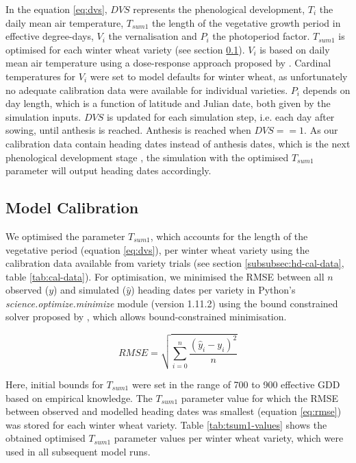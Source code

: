 In the equation \ref{eq:dvs}, $DVS$ represents the phenological development, $T_i$ the daily mean air temperature, $T_{sum1}$ the length of the vegetative growth period in effective degree-days, $V_i$ the vernalisation and $P_i$ the photoperiod factor. $T_{sum1}$ is optimised for each winter wheat variety (see section \ref{subsec:hd-model-cal}). $V_i$ is based on daily mean air temperature using a dose-response approach proposed by \cite{wang_simulation_1998}. Cardinal temperatures for $V_i$ were set to model defaults for winter wheat, as unfortunately no adequate calibration data were available for individual varieties. $P_i$ depends on day length, which is a function of latitude and Julian date, both given by the simulation inputs. $DVS$ is updated for each simulation step, i.e. each day after sowing, until anthesis is reached. Anthesis is reached when $DVS == 1$. As our calibration data contain heading dates instead of anthesis dates, which is the next phenological development stage \citep{meier_growth_2018}, the simulation with the optimised $T_{sum1}$ parameter will output heading dates accordingly.

\subsection{Model Calibration}
\label{subsec:hd-model-cal}
We optimised the parameter $T_{sum1}$, which accounts for the length of the vegetative period (equation \ref{eq:dvs}), per winter wheat variety using the calibration data available from variety trials (see section \ref{subsubsec:hd-cal-data}, table \ref{tab:cal-data}). For optimisation, we minimised the \gls{RMSE} between all $n$ observed ($y$) and simulated ($\hat{y}$) heading dates per variety in Python's \textsl{science.optimize.minimize} module (version 1.11.2) using the bound constrained solver proposed by \cite{powell_efficient_1964}, which allows bound-constrained minimisation.

\begin{equation}
\label{eq:rmse}
    RMSE = \sqrt{\sum_{i=0}^n \frac{(\hat{y}_i - y_i)^2}{n}}
\end{equation}

Here, initial bounds for $T_{sum1}$ were set in the range of 700 to 900 effective \gls{GDD} based on empirical knowledge. The $T_{sum1}$ parameter value for which the RMSE between observed and modelled heading dates was smallest (equation \ref{eq:rmse}) was stored for each winter wheat variety. Table \ref{tab:tsum1-values} shows the obtained optimised $T_{sum1}$ parameter values per winter wheat variety, which were used in all subsequent model runs.

